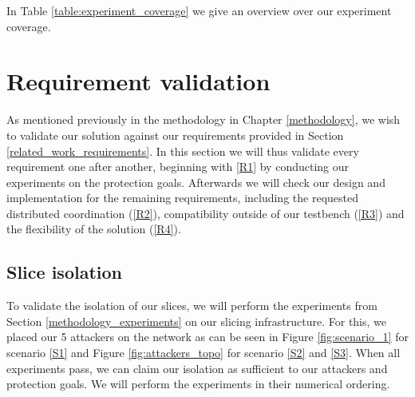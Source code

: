 In Table \ref{table:experiment_coverage} we give an overview over our experiment coverage.


\section{Requirement validation}
As mentioned previously in the methodology in Chapter \ref{methodology}, we wish to validate our solution against our requirements provided in Section \ref{related_work_requirements}. In this section we will thus validate every requirement one after another, beginning with \ref{R1} by conducting our experiments on the protection goals. Afterwards we will check our design and implementation for the remaining requirements, including the requested distributed coordination (\ref{R2}), compatibility outside of our testbench (\ref{R3}) and the flexibility of the solution (\ref{R4}).

\subsection{Slice isolation}
To validate the isolation of our slices, we will perform the experiments from Section \ref{methodology_experiments} on our slicing infrastructure. For this, we placed our 5 attackers on the network as can be seen in Figure \ref{fig:scenario_1} for scenario \ref{S1} and Figure \ref{fig:attackers_topo} for scenario \ref{S2} and \ref{S3}. When all experiments pass, we can claim our isolation as sufficient to our attackers and protection goals.
We will perform the experiments in their numerical ordering.

